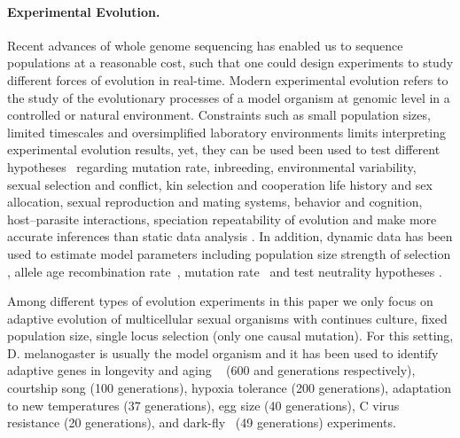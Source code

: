 \documentclass[11pt]{article}
\begin{document}
\paragraph{Experimental Evolution.}
Recent advances of whole genome sequencing has enabled us to sequence 
populations at a reasonable cost, such that one could design experiments
to study different forces of evolution in real-time. Modern experimental 
evolution refers to the study of the evolutionary processes of a model organism 
at genomic level in a 
controlled  
\cite{hegreness2006equivalence,lang2013pervasive,orozco2012adaptation,
	lang2011genetic,barrick2009genome,bollback2007clonal,oz2014strength} 
or natural 
\cite{maldarelli2013hiv,reid2011new,denef2012situ,winters2012development,
	daniels2013genetic,barrett2008natural,bergland2014genomic} environment.
Constraints such as small population sizes, limited 
timescales and oversimplified laboratory
environments limits interpreting experimental evolution results, yet, they can 
be used
been used to test different hypotheses~\cite{kawecki2012experimental}
regarding
mutation rate, 
inbreeding, 
environmental variability,
sexual selection and conflict, 
kin selection and cooperation
life history and sex allocation, 
sexual reproduction and mating systems, 
behavior and cognition, 
host–parasite interactions, 
speciation repeatability of evolution 
and make more accurate inferences 
than static data analysis 
\cite{boyko2008assessing,desai2008polymorphism,sawyer1992population}. In 
addition, dynamic data has been used to estimate model parameters 
including population size
\cite{williamson1999using,wang2001pseudo,pollak1983new,waples1989generalized,
	Terhorst2015Multi}
strength of selection
\cite{mathieson2013estimating,illingworth2011distinguishing,Terhorst2015Multi,
	bollback2008estimation,illingworth2012quantifying,malaspinas2012estimating,
	Steinrücken2014a}, allele age
\cite{malaspinas2012estimating}
recombination rate~\cite{Terhorst2015Multi}, mutation
rate~\cite{Barrick2013Genome, Terhorst2015Multi} and test neutrality hypotheses 
\cite{feder2014Identifying,Terhorst2015Multi,burke2010genome,bergland2014genomic}.

Among different types of evolution experiments 
\cite{Barrick2013Genome,schlotterer2015combining} in 
this 
paper we only focus on adaptive evolution of multicellular sexual organisms 
with 
continues culture, fixed population size, single locus selection (only one 
causal mutation). 
For this setting, D. melanogaster is 
usually the model organism and it has been used to identify adaptive genes in 
longevity and aging ~\cite{burke2010genome,remolina2012genomic} (600 and  
generations respectively),
courtship song \cite{turner2011population} (100 generations),
hypoxia tolerance \cite{zhou2011experimental} (200 generations),
adaptation to new temperatures\cite{orozco2012adaptation,tobler2014massive} (37 
generations),
egg size \cite{jha2015whole} (40 generations),
C virus resistance \cite{martins2014host} (20 generations),
and dark-fly~\cite{izutsu2015dynamics} (49 generations) experiments.
\end{document}
